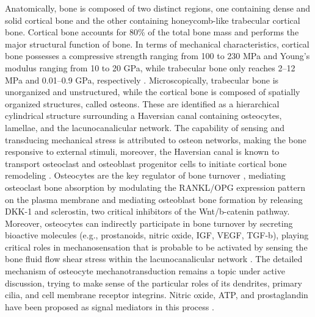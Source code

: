 Anatomically, bone is composed of two distinct regions, one containing dense and solid cortical bone and the other containing honeycomb-like trabecular cortical bone. Cortical bone accounts for 80\% of the total bone mass and performs the major structural function of bone. In terms of mechanical characteristics, cortical bone possesses a compressive strength ranging from 100 to 230 \si{\mega\pascal} and Young’s modulus ranging from 10 to 20 \si{\giga\pascal}, while trabecular bone only reaches 2–12 \si{\mega\pascal} and 0.01–0.9 \si{\giga\pascal}, respectively \cite{Chang2022-ah}. Microscopically, trabecular bone is unorganized and unstructured, while the cortical bone is composed of spatially organized structures, called osteons. These are identified as a hierarchical cylindrical structure surrounding a Haversian canal containing osteocytes, lamellae, and the lacunocanalicular network. The capability of sensing and transducing mechanical stress is attributed to osteon networks, making the bone responsive to external stimuli, moreover, the Haversian canal is known to transport osteoclast and osteoblast progenitor cells to initiate cortical bone remodeling \cite{Chang2022-ah}. Osteocytes are the key regulator of bone turnover \cite{Goldring2015-kn}, mediating osteoclast bone absorption by modulating the RANKL/OPG expression pattern on the plasma membrane and mediating osteoblast bone formation by releasing DKK-1 and sclerostin, two critical inhibitors of the Wnt/b-catenin pathway. Moreover, osteocytes can indirectly participate in bone turnover by secreting bioactive molecules (e.g., prostanoids, nitric oxide, IGF, VEGF, TGF-b), playing critical roles in mechanosensation that is probable to be activated by sensing the bone fluid flow shear stress within the lacunocanalicular network \cite{Murshid2022-rs}. The detailed mechanism of osteocyte mechanotransduction remains a topic under active discussion, trying to make sense of the particular roles of its dendrites, primary cilia, and cell membrane receptor integrins. Nitric oxide, ATP, and prostaglandin have been proposed as signal mediators in this process \cite{Nguyen2013-bx, Geoghegan2019-qi}.

